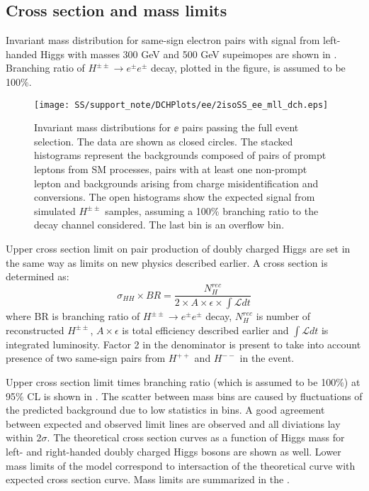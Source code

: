 
\toDo[CLs = CLs+b/CLb. What is the signal in case of limit on new pysics?]

\subsection{Cross section and mass limits}

Invariant mass distribution for same-sign electron pairs with signal from left-handed Higgs with masses 300 GeV and 500 GeV supeimopes are shown in .
Branching ratio of $H^{\pm\pm} \to e^{\pm}e^{\pm}$ decay, plotted in the figure, is assumed to be 100$\%$.

\begin{figure}[h]
\begin{center}
\texttt{[image: SS/support\_note/DCHPlots/ee/2isoSS\_ee\_mll\_dch.eps]}
\caption{\toDo Invariant mass distributions for $\ee$ pairs passing the full event selection. 
The data are shown as closed circles. The stacked histograms represent 
the backgrounds composed of pairs of prompt leptons from SM processes, 
pairs with at least one non-prompt lepton and backgrounds arising from charge misidentification and conversions. 
The open histograms show the expected signal from simulated $H^{\pm\pm}$ samples,
assuming a 100\% branching ratio to the decay channel considered. The last bin is an overflow bin.}
\label{fig:signal_mass}
\end{center}
\end{figure}

Upper cross section limit on pair production of doubly charged Higgs are set in the same way as limits on new physics described earlier.
A cross section is determined as:
\begin{equation}
 \sigma_{HH}\times BR =\frac{N_{H}^{rec}}{2\times A\times \epsilon \times \int \mathscr{L} dt}
\end{equation}
where BR is branching ratio of $H^{\pm\pm} \to e^{\pm}e^{\pm}$ decay, $N_{H}^{rec}$ is number of reconstructed $H^{\pm\pm}$, $A\times \epsilon$ is total efficiency described earlier and
$\int \mathscr{L} dt$ is integrated luminosity.
Factor 2 in the denominator is present to take into account presence of two same-sign pairs from $H^{++}$ and $H^{--}$ in the event.

Upper cross section limit times branching ratio (which is assumed to be 100$\%$) at 95$\%$ CL is shown in .
The scatter between mass bins are caused by fluctuations of the predicted background due to low statistics in bins.
A good agreement between expected and observed limit lines are observed and all diviations lay within $2\sigma$.
The theoretical cross section curves as a function of Higgs mass for left- and right-handed doubly charged Higgs bosons 
are shown as well.
Lower mass limits of the model correspond to intersaction of the theoretical curve with expected cross section curve.
Mass limits are summarized in the .

